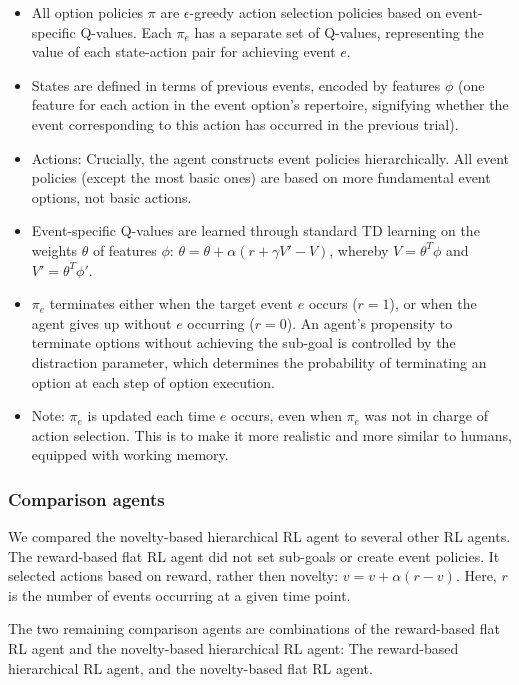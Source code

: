 \documentclass{article}
\begin{document}
\begin{itemize}
	\item All option policies $\pi$ are $\epsilon$-greedy action selection policies based on event-specific Q-values. Each $\pi_e$ has a separate set of Q-values, representing the value of each state-action pair for achieving event $e$. 
	\item States are defined in terms of previous events, encoded by features $\phi$ (one feature for each action in the event option's repertoire, signifying whether the event corresponding to this action has occurred in the previous trial).
	\item Actions: Crucially, the agent constructs event policies hierarchically. All event policies (except the most basic ones) are based on more fundamental event options, not basic actions.
	\item Event-specific Q-values are learned through standard TD learning on the weights $\theta$ of features $\phi$: $\theta = \theta + \alpha (r + \gamma V' - V)$, whereby $V = \theta^T \phi$ and $V' = \theta^T \phi'$.
	\item $\pi_e$ terminates either when the target event $e$ occurs ($r=1$), or when the agent gives up without $e$ occurring ($r=0$). An agent's propensity to terminate options without achieving the sub-goal is controlled by the distraction parameter, which determines the probability of terminating an option at each step of option execution. 
	\item Note: $\pi_e$ is updated each time $e$ occurs, even when $\pi_e$ was not in charge of action selection. This is to make it more realistic and more similar to humans, equipped with working memory.
\end{itemize}

\subsubsection{Comparison agents}

We compared the novelty-based hierarchical RL agent to several other RL agents. The reward-based flat RL agent did not set sub-goals or create event policies. It selected actions based on reward, rather then novelty: $v = v + \alpha (r - v)$. Here, $r$ is the number of events occurring at a given time point. 

The two remaining comparison agents are combinations of the reward-based flat RL agent and the novelty-based hierarchical RL agent: The reward-based hierarchical RL agent, and the novelty-based flat RL agent.
\end{document}

